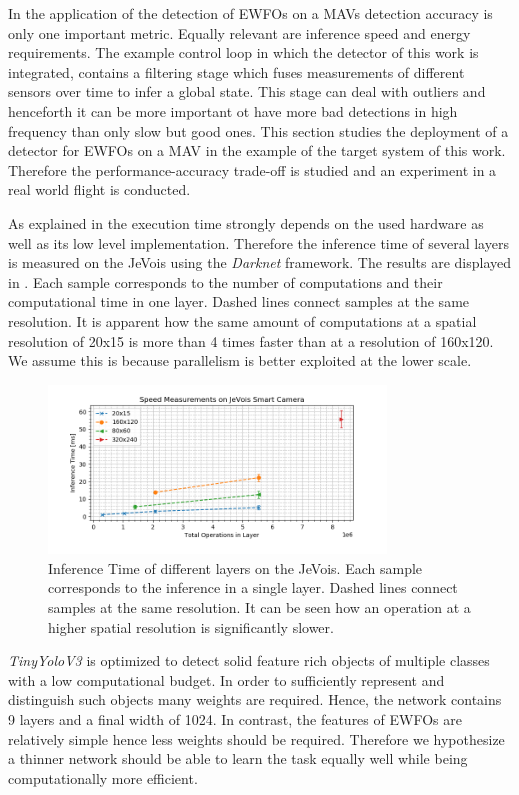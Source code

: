 In the application of the detection of \acp{EWFO} on a \acp{MAV} detection accuracy is only one important metric. Equally relevant are inference speed and energy requirements. The example control loop in which the detector of this work is integrated, contains a filtering stage which fuses measurements of different sensors over time to infer a global state. This stage can deal with outliers and henceforth it can be more important ot have more bad detections in high frequency than only slow but good ones. This section studies the deployment of a detector for \acp{EWFO} on a \ac{MAV} in the example of the target system of this work. Therefore the performance-accuracy trade-off is studied and an experiment in a real world flight is conducted.

As explained in  the execution time strongly depends on the used hardware as well as its low level implementation. Therefore the inference time of several layers is measured on the JeVois using the \textit{Darknet} framework. The results are displayed in . Each sample corresponds to the number of computations and their computational time in one layer. Dashed lines connect samples at the same resolution. It is apparent how the same amount of computations at a spatial resolution of 20x15 is more than 4 times faster than at a resolution of 160x120. We assume this is because parallelism is better exploited at the lower scale.

\begin{figure}[hbtp]
	\centering
	\includegraphics[width=0.8\textwidth]{fig/bottleneck_jevois}
	\caption{Inference Time of different layers on the JeVois. Each sample corresponds to the inference in a single layer. Dashed lines connect samples at the same resolution. It can be seen how an operation at a higher spatial resolution is significantly slower.}
	\label{fig:bottleneck_jevois}
\end{figure}


\textit{TinyYoloV3} is optimized to detect solid feature rich objects of multiple classes with a low computational budget. In order to sufficiently represent and distinguish such objects many weights are required. Hence, the network contains 9 layers and a final width of 1024. In contrast, the features of \acp{EWFO} are relatively simple hence less weights should be required. Therefore we hypothesize a thinner network should be able to learn the task equally well while being computationally more efficient.

